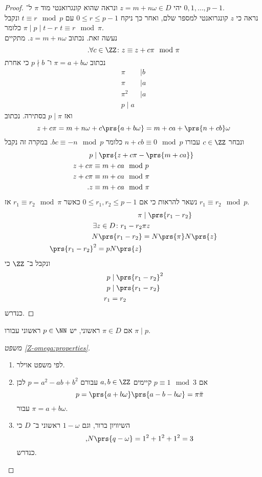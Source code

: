 \documentclass[a4paper,10pt,twoside,openany]{book}
\begin{document}
\begin{proof}
יהי
$z = m+n\omega \in D$
ונראה שהוא קונגרואנטי מוד
$\pi$
ל־%
$0,1,\ldots, p-1$.\\
נראה כי
$z$
קונגרואנטי למספר שלם, ואחר כך ניקח
$0 \leq r \leq p-1$
עם
$t \equiv r \mod{p}$
ונקבל
$\pi \mid p \mid t - r$
כלומר
$t \equiv r \mod{\pi}$.
\\
נעשה זאת. נכתוב
$z = m + n\omega$.
מתקיים
\[\text{.} \forall c \in \ZZ \colon z \equiv z + c\pi \mod{\pi}\]
נכתוב
$\pi = a+b\omega$
ו־%
$p \nmid b$
כי אחרת
\begin{align*}
\pi &\mid b \\
\pi &\mid a \\
\pi^2 &\mid a \\
p \mid a
\end{align*}
ואז
$p \mid \pi$
בסתירה.
נכתוב
\[z+c\pi = m+n\omega + c\prs{a + b\omega} = m+ca + \prs{n+cb}\omega\]
ונבחר
$c \in \ZZ$
עבורו
$n+cb \equiv 0 \mod{p}$
כלומר
$bc \equiv -n \mod{p}$.
במקרה זה נקבל
\begin{align*}
p &\mid \prs{z + c\pi - \prs{m+ca}} \\
z+c\pi &\equiv m +ca \mod{p} \\
z + c\pi &\equiv m + ca \mod{\pi} \\
\text{.} z &\equiv m + ca \mod{\pi}
\end{align*}
נשאר להראות כי אם
$0 \leq r_1, r_2 \leq p-1$
כאשר
$r_1 \equiv r_2 \mod{\pi}$
אז
$r_1 \equiv r_2 \mod{p}$.
\begin{align*}
\pi &\mid \prs{r_1 - r_2} \\
\exists z \in D \colon r_1 - r_2 & \pi z \\
N\prs{r_1 - r_2} &= N\prs{\pi} N\prs{z} \\
\prs{r_1 - r_2}^2 =p N\prs{z}
\end{align*}
ונקבל ב־%
$\ZZ$
כי
\begin{align*}
p &\mid \prs{r_1 - r_2}^2 \\
p &\mid \prs{r_1 - r_2} \\
r_1 &= r_2
\end{align*}
כנדרש.
\end{proof}
\begin{corollary}
אם
$\pi \in D$
ראשוני, יש
$p \in \NN$
ראשוני עבורו
$\pi \mid p$.
\end{corollary}


\begin{proof}[משפט
\ref{Z-omega:properties}]
\begin{enumerate}
\item
לפי משפט אוילר.
\item אם
$p \equiv 1 \mod{3}$
קיימים
$a,b\in \ZZ$
עבורם
$p = a^2 - ab + b^2$
לכן
\[p = \prs{a+b\omega}\prs{a-b-b\omega} = \pi \bar{\pi}\]
עבור
$\pi = a+b\omega$.
\item
השיוויון ברור, וגם
$1-\omega$
ראשוני ב־%
$D$
כי
\[\text{,} N\prs{q-\omega} = 1^2 + 1^2 + 1^2 = 3\]
כנדרש.
\end{enumerate}
\end{proof}
\end{document}
